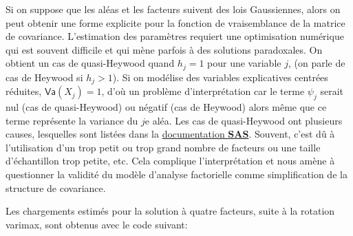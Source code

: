\documentclass[
  11pt,
  letterpaper,
]{scrbook}
\newenvironment{Shaded}{\begin{snugshade}}{\end{snugshade}}
\newcommand{\AttributeTok}[1]{\textcolor[rgb]{0.40,0.45,0.13}{#1}}
\newcommand{\CommentTok}[1]{\textcolor[rgb]{0.37,0.37,0.37}{#1}}
\newcommand{\FloatTok}[1]{\textcolor[rgb]{0.68,0.00,0.00}{#1}}
\newcommand{\FunctionTok}[1]{\textcolor[rgb]{0.28,0.35,0.67}{#1}}
\newcommand{\NormalTok}[1]{\textcolor[rgb]{0.00,0.23,0.31}{#1}}
\newcommand{\OtherTok}[1]{\textcolor[rgb]{0.00,0.23,0.31}{#1}}
\newcommand{\SpecialCharTok}[1]{\textcolor[rgb]{0.37,0.37,0.37}{#1}}
\theoremstyle{definition}
\theoremstyle{remark}
\begin{document}
Si on suppose que les aléas et les facteurs suivent des lois
Gaussiennes, alors on peut obtenir une forme explicite pour la fonction
de vraisemblance de la matrice de covariance. L'estimation des
paramètres requiert une optimisation numérique qui est souvent difficile
et qui mène parfois à des solutions paradoxales. On obtient un cas de
quasi-Heywood quand \(h_j=1\) pour une variable \(j\), (on parle de cas
de Heywood si \(h_j > 1\)). Si on modélise des variables explicatives
centrées réduites, \(\mathsf{Va}(X_j)=1\), d'où un problème
d'interprétation car le terme \(\psi_j\) serait nul (cas de
quasi-Heywood) ou négatif (cas de Heywood) alors même que ce terme
représente la variance du \(j\)e aléa. Les cas de quasi-Heywood ont
plusieurs causes, lesquelles sont listées dans la
\href{https://support.sas.com/documentation/cdl/en/statug/63033/HTML/default/viewer.htm\#statug_factor_sect022.htm}{documentation
\textbf{SAS}}. Souvent, c'est dû à l'utilisation d'un trop petit ou trop
grand nombre de facteurs ou une taille d'échantillon trop petite, etc.
Cela complique l'interprétation et nous amène à questionner la validité
du modèle d'analyse factorielle comme simplification de la structure de
covariance.

Les chargements estimés pour la solution à quatre facteurs, suite à la
rotation varimax, sont obtenus avec le code suivant:

\begin{Shaded}
\end{Shaded}
\end{document}
